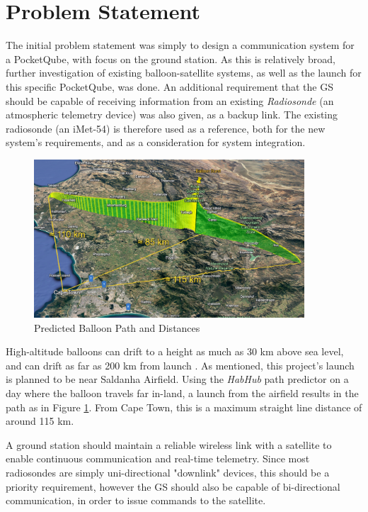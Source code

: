 \graphicspath{{./figures/}}

\section{Problem Statement}

The initial problem statement was simply to design a communication system for a PocketQube, with focus on the ground station. As this is relatively broad, further investigation of existing balloon-satellite systems, as well as the launch for this specific PocketQube, was done. An additional requirement that the GS should be capable of receiving information from an existing \textit{Radiosonde} (an atmospheric telemetry device) was also given, as a backup link. The existing radiosonde (an iMet-54) is therefore used as a reference, both for the new system's requirements, and as a consideration for system integration.

\begin{figure}[!htb]
  \centering
  \includegraphics[width=0.9\textwidth]{balloon_path_3d}
  \caption{Predicted Balloon Path and Distances}
  \label{fig:balloon_path}
\end{figure}

High-altitude balloons can drift to a height as much as 30 km above sea level, and can drift as far as 200 km from launch \cite{site-weatherWeatherBalloons}. As mentioned, this project's launch is planned to be near Saldanha Airfield. Using the \textit{HabHub} path predictor \cite{site-habHub} on a day where the balloon travels far in-land, a launch from the airfield results in the path as in Figure \ref{fig:balloon_path}. From Cape Town, this is a maximum straight line distance of around 115 km. 

A ground station should maintain a reliable wireless link with a satellite to enable continuous communication and real-time telemetry. Since most radiosondes are simply uni-directional "downlink" devices, this should be a priority requirement, however the GS should also be capable of bi-directional communication, in order to issue commands to the satellite.